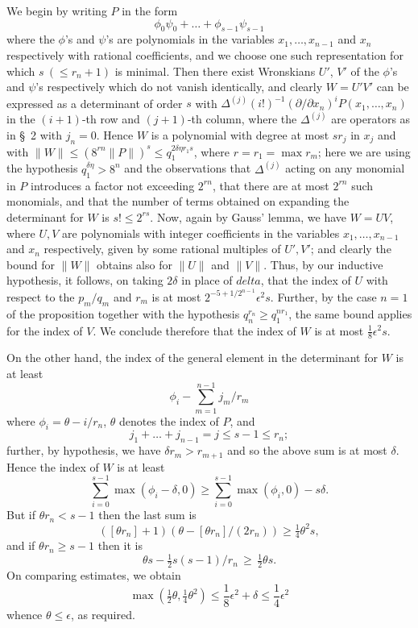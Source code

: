We begin by writing $P$ in the form
\[\phi_0 \psi_0 + \dots + \phi_{s-1} \psi_{s-1}\]
where the $\phi$'s and $\psi$'s are polynomials in the variables $x_1, \dots, x_{n-1}$ and $x_n$ respectively with rational coefficients, and we choose one such representation for which $s \ (\leq r_n + 1)$ is minimal. Then there exist Wronskians $U'$, $V'$ of the $\phi$'s and $\psi$'s respectively which do not vanish identically, and clearly $W = U'V'$ can be expressed as a determinant of order $s$ with $\Delta^{(j)}(i!)^{-1} (\partial/\partial x_n)^i P(x_1, \dots, x_n)$ in the $(i+1)$-th row and $(j+1)$-th column, where the $\Delta^{(j)}$ are operators as in \S~2 with $j_n = 0$. Hence $W$ is a polynomial with degree at most $s r_j$ in $x_j$ and with $\|W\| \leq (8^{rn} \|P\|)^s \leq q_1^{2\delta\eta r_1 s}$, where $r=r_1=\max r_m$; here we are using the hypothesis $q_1^{\delta\eta}>8^n$ and the observations that $\Delta^{(j)}$ acting on any monomial in $P$ introduces a factor not exceeding $2^{rn}$, that there are at most $2^{rn}$ such monomials, and that the number of terms obtained on expanding the determinant for $W$ is $s!\leqslant 2^{rs}$. Now, again by Gauss' lemma, we have $W=UV$, where $U,V$ are polynomials with integer coefficients in the variables $x_1,\dots,x_{n-1}$ and $x_n$ respectively, given by some rational multiples of $U',V'$; and clearly the bound for $\|W\|$ obtains also for $\|U\|$ and $\|V\|$. Thus, by our inductive hypothesis, it follows, on taking $2\delta$ in place of $delta$, that the index of $U$ with respect to the $p_m/q_m$ and $r_m$ is at most $2^{-5+1/2^{n-1}} \epsilon^2 s$. Further, by the case $n=1$ of the proposition together with the hypothesis $q_n^{r_n}\geqslant q_1^{n r_1}$, the same bound applies for the index of $V$. We conclude therefore that the index of $W$ is at most $\frac{1}{8} \epsilon^2 s$.

On the other hand, the index of the general element in the determinant for $W$ is at least
\[\phi_i - \sum_{m=1}^{n-1} j_m / r_m\]
where $\phi_i = \theta - i/r_n$, $\theta$ denotes the index of $P$, and
\[j_1+\dots+j_{n-1}=j\leqslant s-1\leqslant r_n;\]
further, by hypothesis, we have  $\delta r_m > r_{m+1}$ and so the above sum is at most $\delta$. Hence the index of $W$ is at least
\[\sum_{i=0}^{s-1} \max (\phi_i - \delta, 0) \geqslant \sum_{i=0}^{s-1} \max (\phi_i, 0) - s\delta.\]
But if $\theta r_n < s-1$ then the last sum is
\[([\theta r_n]+1)\left(\theta-[\theta r_n]/(2r_n)\right)\geqslant \tfrac{1}{4}\theta^2 s,\]
and if $\theta r_n \geqslant s-1$ then it is
\[\theta s - \tfrac{1}{2} s(s-1)/r_n \, \geqslant \, \tfrac{1}{2} \theta s.\]
On comparing estimates, we obtain
\[\max(\tfrac{1}{2}\theta, \tfrac{1}{4}\theta^2) \leqslant \frac{1}{8}\epsilon^2 + \delta \leqslant \frac{1}{4}\epsilon^2\]
whence $\theta \leqslant \epsilon$, as required.

